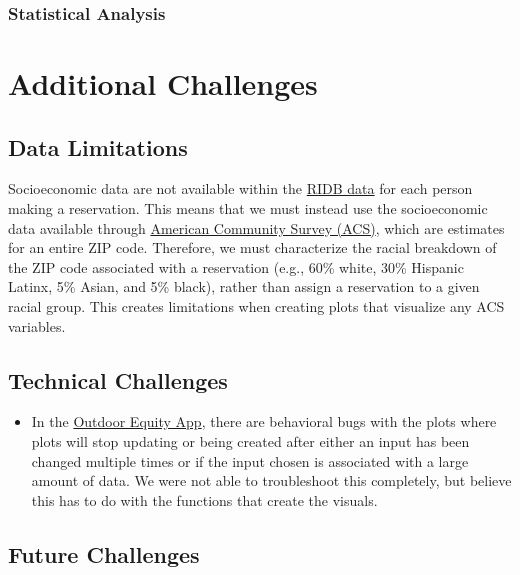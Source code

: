 \documentclass[
]{book}
\providecommand{\tightlist}{%
  \setlength{\itemsep}{0pt}\setlength{\parskip}{0pt}}
\begin{document}
\hypertarget{statistical-analysis}{%
\subsection{Statistical Analysis}\label{statistical-analysis}}

\hypertarget{additional-challenges}{%
\chapter{Additional Challenges}\label{additional-challenges}}

\hypertarget{data-limitations}{%
\section{Data Limitations}\label{data-limitations}}

Socioeconomic data are not available within the \href{https://ridb.recreation.gov/landing}{RIDB data} for each person making a reservation. This means that we must instead use the socioeconomic data available through \href{https://www.census.gov/programs-surveys/acs/data.html}{American Community Survey (ACS)}, which are estimates for an entire ZIP code. Therefore, we must characterize the racial breakdown of the ZIP code associated with a reservation (e.g., 60\% white, 30\% Hispanic Latinx, 5\% Asian, and 5\% black), rather than assign a reservation to a given racial group. This creates limitations when creating plots that visualize any ACS variables.

\hypertarget{technical-challenges}{%
\section{Technical Challenges}\label{technical-challenges}}

\begin{itemize}
\tightlist
\item
  In the \href{https://shinyapps.bren.ucsb.edu/oe_app/}{Outdoor Equity App}, there are behavioral bugs with the plots where plots will stop updating or being created after either an input has been changed multiple times or if the input chosen is associated with a large amount of data. We were not able to troubleshoot this completely, but believe this has to do with the functions that create the visuals.
\end{itemize}

\hypertarget{future-challenges}{%
\section{Future Challenges}\label{future-challenges}}
\end{document}
